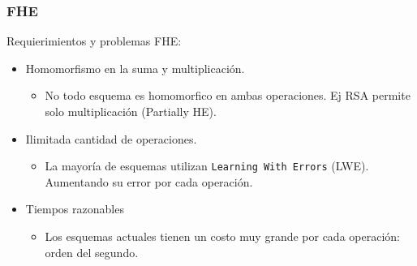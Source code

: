 \documentclass[handout]{beamer}
\begin{document}




\begin{frame}
\frametitle{FHE}
Requierimientos y problemas FHE:
    \vspace{-0.3cm}
\begin{itemize}
  \item[\textcolor{frenchblue}{\textbullet}] Homomorfismo en la suma y multiplicación.
    \vspace{-0.3cm}
    \begin{itemize}
      \item[\textcolor{red}{\textbullet}]  No todo esquema es homomorfico en ambas operaciones. Ej RSA permite solo multiplicación (Partially HE).
    \end{itemize}
    \vspace{-0.3cm}
  \item[\textcolor{frenchblue}{\textbullet}] Ilimitada cantidad de operaciones.
    \vspace{-0.3cm}
    \begin{itemize}
      \item[\textcolor{red}{\textbullet}]  La mayoría de esquemas utilizan \texttt{Learning With Errors} (LWE). Aumentando su error por cada operación.
    \end{itemize}
    \vspace{-0.3cm}
  \item[\textcolor{frenchblue}{\textbullet}] Tiempos razonables
    \vspace{-0.3cm}
    \begin{itemize}
      \item[\textcolor{red}{\textbullet}]  Los esquemas actuales tienen un costo muy grande por cada operación: orden del segundo.
    \end{itemize}
\end{itemize}

\end{frame}
\end{document}
